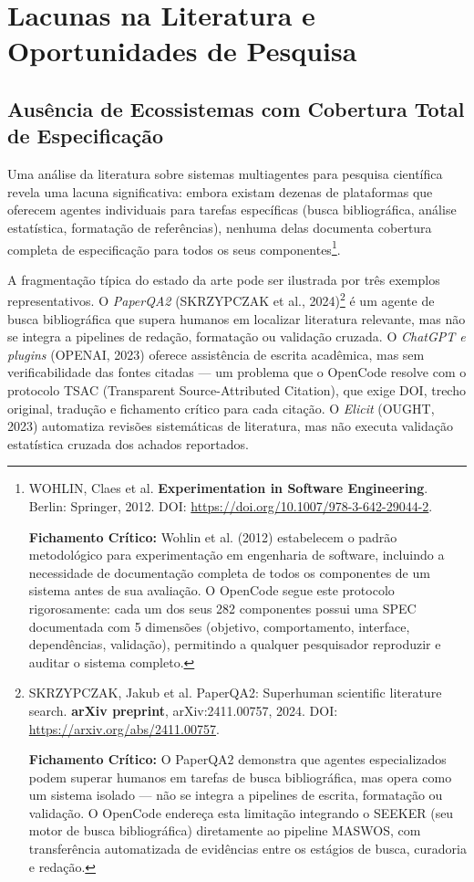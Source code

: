 
\section{Lacunas na Literatura e Oportunidades de Pesquisa}

\subsection{Ausência de Ecossistemas com Cobertura Total de Especificação}

Uma análise da literatura sobre sistemas multiagentes para pesquisa científica revela uma lacuna significativa: embora existam dezenas de plataformas que oferecem agentes individuais para tarefas específicas (busca bibliográfica, análise estatística, formatação de referências), nenhuma delas documenta cobertura completa de especificação para todos os seus componentes\footnote{
  WOHLIN, Claes et al. \textbf{Experimentation in Software Engineering}. Berlin: Springer, 2012. DOI: \url{https://doi.org/10.1007/978-3-642-29044-2}.

  \textbf{Fichamento Crítico:} Wohlin et al. (2012) estabelecem o padrão metodológico para experimentação em engenharia de software, incluindo a necessidade de documentação completa de todos os componentes de um sistema antes de sua avaliação. O OpenCode segue este protocolo rigorosamente: cada um dos seus 282 componentes possui uma SPEC documentada com 5 dimensões (objetivo, comportamento, interface, dependências, validação), permitindo a qualquer pesquisador reproduzir e auditar o sistema completo.
}.

A fragmentação típica do estado da arte pode ser ilustrada por três exemplos representativos. O \textit{PaperQA2} (SKRZYPCZAK et al., 2024)\footnote{
  SKRZYPCZAK, Jakub et al. PaperQA2: Superhuman scientific literature search. \textbf{arXiv preprint}, arXiv:2411.00757, 2024. DOI: \url{https://arxiv.org/abs/2411.00757}.

  \textbf{Fichamento Crítico:} O PaperQA2 demonstra que agentes especializados podem superar humanos em tarefas de busca bibliográfica, mas opera como um sistema isolado --- não se integra a pipelines de escrita, formatação ou validação. O OpenCode endereça esta limitação integrando o SEEKER (seu motor de busca bibliográfica) diretamente ao pipeline MASWOS, com transferência automatizada de evidências entre os estágios de busca, curadoria e redação.
} é um agente de busca bibliográfica que supera humanos em localizar literatura relevante, mas não se integra a pipelines de redação, formatação ou validação cruzada. O \textit{ChatGPT e plugins} (OPENAI, 2023) oferece assistência de escrita acadêmica, mas sem verificabilidade das fontes citadas --- um problema que o OpenCode resolve com o protocolo TSAC (Transparent Source-Attributed Citation), que exige DOI, trecho original, tradução e fichamento crítico para cada citação. O \textit{Elicit} (OUGHT, 2023) automatiza revisões sistemáticas de literatura, mas não executa validação estatística cruzada dos achados reportados.

